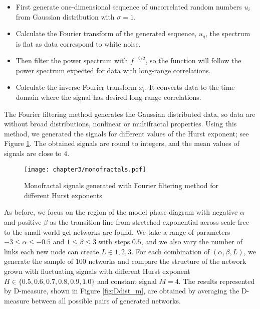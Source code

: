 \begin{itemize}
	\item First generate one-dimensional sequence of uncorrelated random numbers $u_i$ from Gaussian distribution with $\sigma=1$.
	\item Calculate the Fourier transform of the generated sequence, $u_q$, the spectrum is flat as data correspond to white noise.
	\item Then filter the power spectrum with $f^{-\beta/2}$, so the function will follow the power spectrum expected for data with long-range correlations. 	
	\item  Calculate the inverse Fourier transform $x_i$. It converts data to the time domain where the signal has desired long-range correlations.
	
\end{itemize}     

The Fourier filtering method generates the Gaussian distributed data, so data are without broad distributions, nonlinear or multifractal properties. Using this method, we generated the signals for different values of the Hurst exponent; see Figure \ref{fig:monofractals}. The obtained signals are round to integers, and the mean values of signals are close to $4$.

\begin{figure}[ht!]
	\centering
	\texttt{[image: chapter3/monofractals.pdf]}
	\caption[Long range correlated monofractal signals.]{Monofractal signals generated with Fourier filtering method for different Hurst exponents}
	\label{fig:monofractals}
\end{figure}  

As before, we focus on the region of the model phase diagram with negative $\alpha$ and positive $\beta$ as the transition line from stretched-exponential across scale-free to the small world-gel networks are found. We take a range of parameters  $-3\leq\alpha\leq-0.5$ and $1\leq\beta\leq3$ with steps $0.5$, and we also vary the number of links each new node can create $L\in{1, 2, 3}$. For each combination of $(\alpha, \beta, L)$, we generate the sample of $100$ networks and compare the structure of the network grown with fluctuating signals with different Hurst exponent $H \in \{0.5, 0.6, 0.7, 0.8, 0.9, 1.0\}$ and constant signal $M=4$. The results represented by D-measure, shown in Figure \ref{fig:Ddist_m}, are obtained by averaging the D-measure between all possible pairs of generated networks.   

